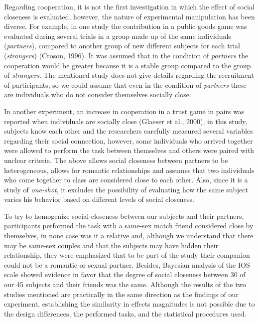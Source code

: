 \documentclass[12pt,]{article}
\begin{document}
Regarding cooperation, it is not the first investigation in which the
effect of social closeness is evaluated, however, the nature of
experimental manipulation has been diverse. For example, in one study
the contribution in a public goods game was evaluated during several
trials in a group made up of the same individuals (\emph{partners}),
compared to another group of new different subjects for each trial
(\emph{strangers}) (Croson, 1996). It was assumed that in the condition
of \emph{partners} the cooperation would be greater because it is a
stable group compared to the group of \emph{strangers}. The mentioned
study does not give details regarding the recruitment of participants,
so we could assume that even in the condition of \emph{partners} these
are individuals who do not consider themselves socially close.

In another experiment, an increase in cooperation in a trust game in
pairs was reported when individuals are socially close (Glaeser et al.,
2000), in this study, subjects know each other and the researchers
carefully measured several variables regarding their social connection,
however, some individuals who arrived together were allowed to perform
the task between themselves and others were paired with unclear
criteria. The above allows social closeness between partners to be
heterogeneous, allows for romantic relationships and assumes that two
individuals who come together to class are considered close to each
other. Also, since it is a study of \emph{one-shot}, it excludes the
possibility of evaluating how the same subject varies his behavior based
on different levels of social closeness.

To try to homogenize social closeness between our subjects and their
partners, participants performed the task with a same-sex match friend
considered close by themselves, in none case was it a relative and,
although we understand that there may be same-sex couples and that the
subjects may have hidden their relationship, they were emphasized that
to be part of the study their companion could not be a romantic or
sexual partner. Besides, Bayesian analysis of the IOS scale showed
evidence in favor that the degree of social closeness between 30 of our
45 subjects and their friends was the same. Although the results of the
two studies mentioned are practically in the same direction as the
findings of our experiment, establishing the similarity in effects
magnitudes is not possible due to the design differences, the performed
tasks, and the statistical procedures used.
\end{document}
